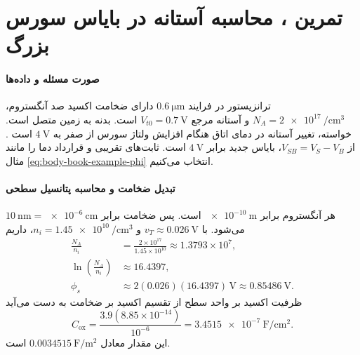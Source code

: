 \section*{تمرین ، محاسبه آستانه در بایاس سورس بزرگ}
\paragraph*{صورت مسئله و داده‌ها}
ترانزیستور  در فرایند \(\qty{0.6}{\micro\metre}\) دارای
ضخامت اکسید صد آنگستروم،
\(N_A=\qty{2e17}{\per\centi\metre\cubed}\) و آستانه مرجع
\(V_{t0}=\qty{0.7}{\volt}\) است. بدنه به زمین متصل است. خواسته،
تغییر آستانه در دمای اتاق هنگام افزایش ولتاژ سورس از صفر به
\(\qty{4}{\volt}\) است \cite[تمرین ، صفحه ۹۶]{weste}.
از \(V_{SB}=V_S-V_B\)، بایاس جدید برابر \(\qty{4}{\volt}\) است.
ثابت‌های تقریبی و قرارداد دما را مانند مثال
\eqref{eq:body-book-example-phi} انتخاب می‌کنیم.

\paragraph*{تبدیل ضخامت و محاسبه پتانسیل سطحی}
هر آنگستروم برابر \(\qty{e-10}{\metre}\) است. پس ضخامت برابر
\(\qty{10}{\nano\metre}=\qty{e-6}{\centi\metre}\) می‌شود.
با \(v_T\approx\qty{0.026}{\volt}\) و
\(n_i=\qty{1.45e10}{\per\centi\metre\cubed}\)، داریم
\begin{align*}
 \frac{N_A}{n_i}&=\frac{2\times10^{17}}{1.45\times10^{10}}
 \approx1.3793\times10^7,\\
 \ln\!\left(\frac{N_A}{n_i}\right)&\approx16.4397,\\
 \phi_s&\approx2(0.026)(16.4397)\,\unit{\volt}
 \approx\qty{0.85486}{\volt}.
\end{align*}
ظرفیت اکسید بر واحد سطح از تقسیم  اکسید بر ضخامت
به دست می‌آید
\begin{equation*}
 C_{\mathrm{ox}}=\frac{3.9(8.85\times10^{-14})}{10^{-6}}
 =\qty{3.4515e-7}{\farad\per\centi\metre\squared}.
\end{equation*}
این مقدار معادل \(\qty{0.0034515}{\farad\per\metre\squared}\) است.

